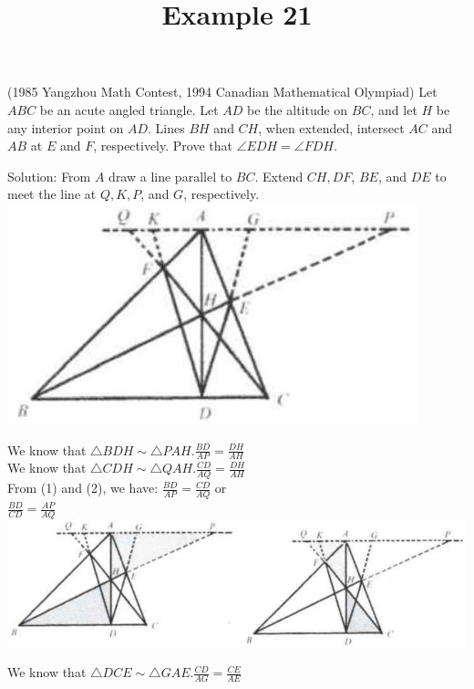 \documentclass{article}
\title{Example 21}
\date{}
\begin{document}
\maketitle

(1985 Yangzhou Math Contest, 1994 Canadian Mathematical Olympiad) Let \(A B C\) be an acute angled triangle. Let \(A D\) be the altitude on \(B C\), and let \(H\) be any interior point on \(A D\). Lines \(B H\) and \(C H\), when extended, intersect \(A C\) and \(A B\) at \(E\) and \(F\), respectively. Prove that \(\angle E D H=\angle F D H\).

Solution:
From \(A\) draw a line parallel to \(B C\). Extend \(C H, D F\), \(B E\), and \(D E\) to meet the line at \(Q, K, P\), and \(G\), respectively.\\
\centering
\includegraphics[width=\textwidth]{images/124(1).jpg}

We know that \(\triangle B D H \sim \triangle P A H . \frac{B D}{A P}=\frac{D H}{A H}\)\\
We know that \(\triangle C D H \sim \triangle Q A H . \frac{C D}{A Q}=\frac{D H}{A H}\)\\
From (1) and (2), we have: \(\frac{B D}{A P}=\frac{C D}{A Q}\) or\\
\(\frac{B D}{C D}=\frac{A P}{A Q}\)\\
\centering
\includegraphics[width=\textwidth]{images/124(3).jpg}

We know that \(\triangle D C E \sim \triangle G A E . \frac{C D}{A G}=\frac{C E}{A E}\)
\end{document}
